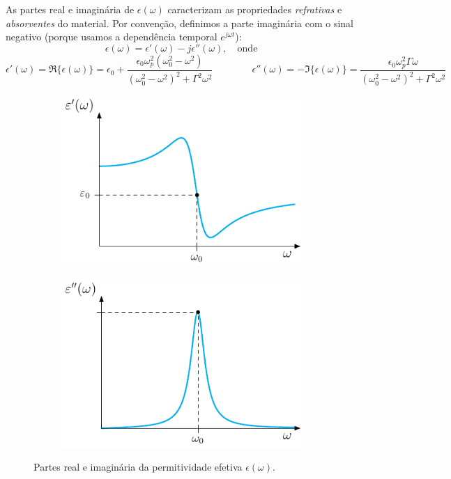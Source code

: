 \begin{warning}
    As partes real e imaginária de $\epsilon(\omega)$ caracterizam as propriedades \emph{refrativas} e \emph{absorventes} do material. Por convenção, definimos a parte imaginária com o sinal negativo (porque usamos a dependência temporal $e^{j\omega t}$):
    $$
        \epsilon(\omega) = \epsilon'(\omega) - j\epsilon''(\omega), \quad \text{onde}
    $$
    $$
            \epsilon'(\omega) = \Re\{\epsilon(\omega)\} = \epsilon_0 + \frac{\epsilon_0\omega_p^2(\omega_0^2 - \omega^2)}{(\omega_0^2 - \omega^2)^2 + \Gamma^2\omega^2} 
            \qquad\qquad
            \epsilon''(\omega) = -\Im\{\epsilon(\omega)\} = \frac{\epsilon_0\omega_p^2\Gamma\omega}{(\omega_0^2 - \omega^2)^2 + \Gamma^2\omega^2}
    $$
    \vspace{-1.5em}
    \begin{figure}[H]
        \centering
        \begin{subfigure}[b]{0.45\linewidth}
            \centering
            \includegraphics[width=\linewidth]{img/1/Epsilon_real.pdf}
        \end{subfigure}\hfil
        \begin{subfigure}[b]{0.45\linewidth}
            \centering
            \includegraphics[width=\linewidth]{img/1/Epsilon_imag.pdf}
        \end{subfigure}
        \caption{Partes real e imaginária da permitividade efetiva $\epsilon(\omega)$.}
    \end{figure}


\end{warning}
